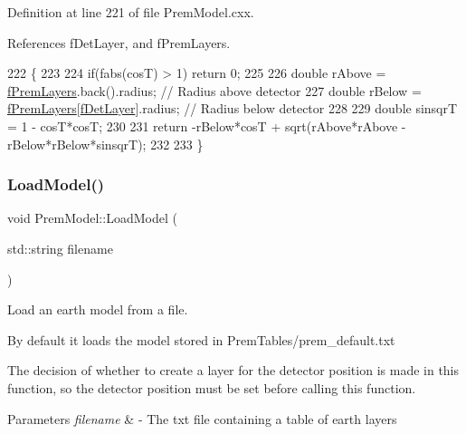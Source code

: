 Definition at line 221 of file Prem\+Model.\+cxx.



References f\+Det\+Layer, and f\+Prem\+Layers.


\begin{DoxyCode}
222 \{
223 
224   \textcolor{keywordflow}{if}(fabs(cosT) > 1) \textcolor{keywordflow}{return} 0;
225 
226   \textcolor{keywordtype}{double} rAbove = \hyperlink{classOscProb_1_1PremModel_a19a9a3b23ec154ad7a29f92b74aa5bc6}{fPremLayers}.back().radius;     \textcolor{comment}{// Radius above detector}
227   \textcolor{keywordtype}{double} rBelow = \hyperlink{classOscProb_1_1PremModel_a19a9a3b23ec154ad7a29f92b74aa5bc6}{fPremLayers}[\hyperlink{classOscProb_1_1PremModel_a4fb68506493666349f418b893a996185}{fDetLayer}].radius; \textcolor{comment}{// Radius below detector}
228 
229   \textcolor{keywordtype}{double} sinsqrT = 1 - cosT*cosT;
230 
231   \textcolor{keywordflow}{return} -rBelow*cosT + sqrt(rAbove*rAbove - rBelow*rBelow*sinsqrT);
232 
233 \}
\end{DoxyCode}
\mbox{\label{classOscProb_1_1PremModel_a6363a5e711dd8b0d2e684677e585b293}} 
\subsubsection{\texorpdfstring{Load\+Model()}{LoadModel()}}
{\footnotesize\ttfamily void Prem\+Model\+::\+Load\+Model (\begin{DoxyParamCaption}\item[{std\+::string}]{filename }\end{DoxyParamCaption})\hspace{0.3cm}{\ttfamily [virtual]}}

Load an earth model from a file.

By default it loads the model stored in Prem\+Tables/prem\+\_\+default.\+txt

The decision of whether to create a layer for the detector position is made in this function, so the detector position must be set before calling this function.


\begin{DoxyParams}{Parameters}
{\em filename} & -\/ The txt file containing a table of earth layers \\
\hline
\end{DoxyParams}


